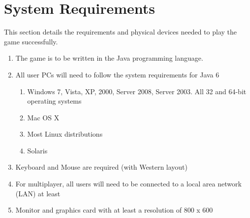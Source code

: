 \section{System Requirements}
\label {sec: system_requirements}
This section details the requirements and physical devices needed to play the game successfully.

\begin{enumerate}
\item The game is to be written in the Java programming language.
\item All user PCs will need to follow the system requirements for Java 6
\begin{enumerate}
\item Windows 7, Vista, XP, 2000, Server 2008, Server 2003. All 32 and 64-bit operating systems
\item Mac OS X
\item Most Linux distributions
\item Solaris
\end{enumerate}
\item Keyboard and Mouse are required (with Western layout)
\item For multiplayer, all users will need to be connected to a local area network (LAN) at least
\item Monitor and graphics card with at least a resolution of 800 x 600 
\end{enumerate}